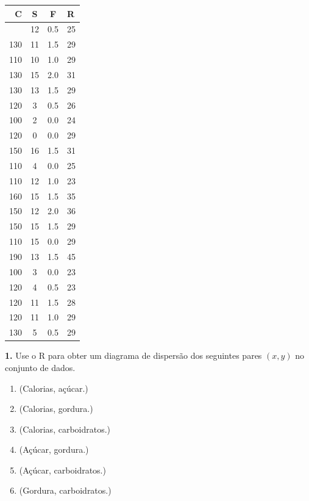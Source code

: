 \documentclass[
]{book}
\newcounter{none} %
\providecommand{\tightlist}{%
  \setlength{\itemsep}{0pt}\setlength{\parskip}{0pt}}
\begin{document}
{\def\LTcaptype{none} %
\begin{longtable}[]{@{}rccl@{}}
\toprule\noalign{}
C & S & F & R \\
\midrule\noalign{}
\endhead
\bottomrule\noalign{}
\endlastfoot
100 & 12 & 0.5 & 25 \\
130 & 11 & 1.5 & 29 \\
110 & 10 & 1.0 & 29 \\
130 & 15 & 2.0 & 31 \\
130 & 13 & 1.5 & 29 \\
120 & 3 & 0.5 & 26 \\
100 & 2 & 0.0 & 24 \\
120 & 0 & 0.0 & 29 \\
150 & 16 & 1.5 & 31 \\
110 & 4 & 0.0 & 25 \\
110 & 12 & 1.0 & 23 \\
160 & 15 & 1.5 & 35 \\
150 & 12 & 2.0 & 36 \\
150 & 15 & 1.5 & 29 \\
110 & 15 & 0.0 & 29 \\
190 & 13 & 1.5 & 45 \\
100 & 3 & 0.0 & 23 \\
120 & 4 & 0.5 & 23 \\
120 & 11 & 1.5 & 28 \\
120 & 11 & 1.0 & 29 \\
130 & 5 & 0.5 & 29 \\
\end{longtable}
}

\textbf{1.} Use o R para obter um diagrama de dispersão dos seguintes pares \((x, y)\) no conjunto de dados.

\begin{enumerate}
\def\labelenumi{(\alph{enumi})}
\tightlist
\item
  (Calorias, açúcar.)\\
\item
  (Calorias, gordura.)\\
\item
  (Calorias, carboidratos.)\\
\item
  (Açúcar, gordura.)\\
\item
  (Açúcar, carboidratos.)\\
\item
  (Gordura, carboidratos.)
\end{enumerate}
\end{document}
